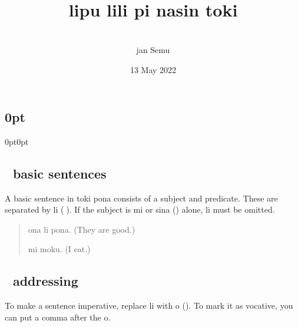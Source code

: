 \documentclass[statementpaper,oneside,article,14pt]{memoir}
\newcommand{\BackgroundPic}[1]{%
\put(0,0){%
\parbox[b][\paperheight]{\paperwidth}{%
\vfill
\centering
{\transparent{0.4} \texttt{[image: \#1]}}%
\vfill
}}}
\begin{document}
\titlespacing\subsection{0pt}{0pt}{0pt}

\newcommand{\nimi}[3]{\item[{\sitpon#1} #2] #3}


\title{{} \\ lipu lili pi nasin toki}
\author{{\sitpon󱤑󱦐󱥚󱤉󱤻󱥱󱦑} \\ jan Semu}
\date{13 May 2022}

\begingroup
\let\cleardoublepage\clearpage


\begin{titlingpage}
\maketitle


\end{titlingpage}

\endgroup

\pagestyle{empty}



\subsection{{\sitpon󱤧} basic sentences}

\noindent A basic sentence in toki pona consists of a subject and predicate. These are separated by li ({\sitpon󱤧}).
If the subject is mi or sina ({}) alone, li must be omitted.

\begin{quote}
  ona li pona. (They are good.)

  mi moku. (I eat.)
\end{quote}

\subsection{{\sitpon󱥄} addressing}

\noindent To make a sentence imperative, replace li with o ({}). To mark it as vocative, you can put a comma after the o.
\end{document}
